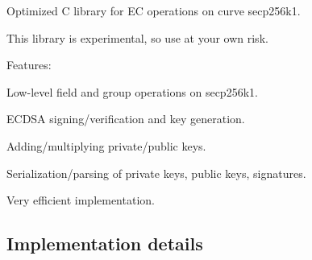 \href{https://travis-ci.org/bitcoin/secp256k1}{\tt }

Optimized C library for EC operations on curve secp256k1.

This library is experimental, so use at your own risk.

Features\+:
\begin{DoxyItemize}
\item Low-\/level field and group operations on secp256k1.
\item E\+C\+D\+SA signing/verification and key generation.
\item Adding/multiplying private/public keys.
\item Serialization/parsing of private keys, public keys, signatures.
\item Very efficient implementation.
\end{DoxyItemize}

\subsection*{Implementation details }


